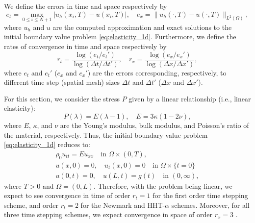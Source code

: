 \documentclass{sfuthesis}
\numberwithin{equation}{section}
\numberwithin{figure}{chapter}
\numberwithin{table}{chapter}
\theoremstyle{definition}
\begin{document}
We define the errors in time and space respectively by
\begin{equation}
    e_t = \max_{0 \leq i \leq N+1} |u_h(x_i,T) - u(x_i,T)|, \quad e_x = \| u_h(\cdot,T) - u(\cdot,T)\|_{L^2(\Omega)},
\end{equation}
where $u_h$ and $u$ are the computed approximation and exact solutions to the initial boundary value problem \eqref{eq:elasticity_1d}. Furthermore, we define the rates of convergence in time and space respectively by
\begin{equation}
    r_t = \dfrac{\log(e_t/e_t')}{\log(\Delta t / \Delta t')}, \quad r_x = \dfrac{\log(e_x/e_x')}{\log(\Delta x / \Delta x')},
\end{equation}
where $e_t$ and $e_t'$ ($e_x$ and $e_x'$) are the errors corresponding, respectively, to different time step (spatial mesh) sizes $\Delta t$ and $\Delta t'$ ($\Delta x$ and $\Delta x'$).

For this section, we consider the stress $P$ given by a linear relationship (i.e., linear elasticity):
\begin{equation}
    P(\lambda) = E(\lambda-1), \quad E = 3\kappa(1-2\nu),
\end{equation}
where $E$, $\kappa$, and $\nu$ are the Young's modulus, bulk modulus, and Poisson's ratio of the material, respectively. Thus, the initial boundary value problem \eqref{eq:elasticity_1d} reduces to:
\begin{subequations} \label{eq:elasticity_linear}
    \begin{gather}
        \rho_0 u_{tt} = E u_{xx} \quad \text{in }\Omega \times (0,T), \\
	    u(x,0) = 0, \quad u_t(x,0) = 0 \quad \text{in } \Omega \times \{t=0\} \\
	    u(0,t) = 0, \quad u(L,t) = g(t) \quad \text{in } (0,\infty),
    \end{gather}
\end{subequations}
where $T>0$ and $\Omega = (0,L)$. Therefore, with the problem being linear, we expect to see convergence in time of order $r_t=1$ for the first order time stepping scheme, and order $r_t=2$ for the Newmark and HHT-$\alpha$ schemes. Moreover, for all three time stepping schemes, we expect convergence in space of order $r_x = 3$ \cite{ErnGuermondBook}. 
\end{document}
